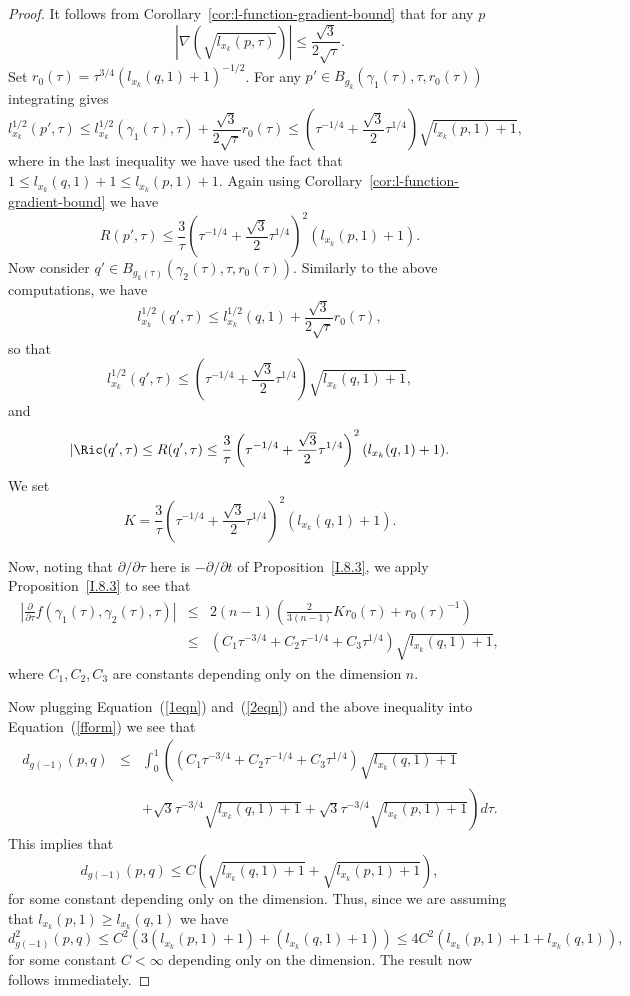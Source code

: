 \begin{proof}
 It follows from
Corollary~\ref{cor:l-function-gradient-bound} that for any $p$
$$|\nabla (\sqrt{l_{x_k}(p,\tau)})|\le
\frac{\sqrt{3}}{2\sqrt{\tau}}.$$ Set
$r_0(\tau)=\tau^{3/4}(l_{x_k}(q,1)+1)^{-1/2}$. For any $p'\in
B_{g_k}(\gamma_1(\tau),\tau,r_0(\tau))$ integrating gives
$$l_{x_k}^{1/2}(p',\tau)\le
l_{x_k}^{1/2}(\gamma_1(\tau),\tau)+\frac{\sqrt{3}}{2\sqrt{\tau}}r_0(\tau)\le
\left(\tau^{-1/4}+\frac{\sqrt{3}}{2}\tau^{1/4}\right)\sqrt{l_{x_k}(p,1)+1},$$
where in the last inequality we have used the fact that $1\le
l_{x_k}(q,1)+1\le l_{x_k}(p,1)+1$. Again using
Corollary~\ref{cor:l-function-gradient-bound} we have
$$R(p',\tau)\le
\frac{3}{\tau}\left(\tau^{-1/4}+\frac{\sqrt{3}}{2}\tau^{1/4}\right)^2(l_{x_k}(p,1)+1).$$
Now consider $q'\in B_{g_k(\tau)}(\gamma_2(\tau),\tau,r_0(\tau))$.
Similarly to the above computations, we have
$$l^{1/2}_{x_k}(q',\tau)\le
l_{x_k}^{1/2}(q,1)+\frac{\sqrt{3}}{2\sqrt{\tau}}r_0(\tau),$$ so that
$$l_{x_k}^{1/2}(q',\tau)\le \left(\tau^{-1/4}
+\frac{\sqrt{3}}{2}\tau^{1/4}\right)\sqrt{l_{x_k}(q,1)+1},$$ and
$$|\Ric(q',\tau)\le R(q',\tau)\le
\frac{3}{\tau}\left(\tau^{-1/4}+\frac{\sqrt{3}}{2}\tau^{1/4}\right)^2(l_{x_k}(q,1)+1).$$
We set
$$K=\frac{3}{\tau}\left(\tau^{-1/4}+\frac{\sqrt{3}}{2}\tau^{1/4}\right)^2(l_{x_k}(q,1)+1).$$

Now, noting that $\partial/\partial \tau$ here is
$-\partial/\partial t$ of Proposition~\ref{I.8.3}, we apply
Proposition~\ref{I.8.3} to see that
\begin{eqnarray*}
\left|\frac{\partial}{\partial
\tau}f(\gamma_1(\tau),\gamma_2(\tau),\tau)\right|
& \le & 2(n-1)\left(\frac{2}{3(n-1)}Kr_0(\tau)+r_0(\tau)^{-1}\right) \\
& \le &
\left(C_1\tau^{-3/4}+C_2\tau^{-1/4}+C_3\tau^{1/4}\right)\sqrt{l_{x_k}(q,1)+1},
\end{eqnarray*}
where $C_1,C_2,C_3$ are constants depending only on the dimension
$n$.

Now plugging Equation~(\ref{1eqn}) and~(\ref{2eqn}) and  the above
inequality into Equation~(\ref{fform}) we see that
\begin{eqnarray*}
d_{g(-1)}(p,q) & \le &
\int_0^1\left(\left(C_1\tau^{-3/4}+C_2\tau^{-1/4}+C_3\tau^{1/4}\right)\sqrt{l_{x_k}(q,1)+1}\right.
\\ & & +
\left.\sqrt{3}\tau^{-3/4}\sqrt{l_{x_k}(q,1)+1}+\sqrt{3}\tau^{-3/4}\sqrt{l_{x_k}(p,1)+1}\right)d\tau.
\end{eqnarray*}
This implies that
$$d_{g(-1)}(p,q)\le
C\left(\sqrt{l_{x_k}(q,1)+1}+\sqrt{l_{x_k}(p,1)+1}\right),$$ for
some constant depending only on the dimension. Thus, since we are
assuming that $l_{x_k}(p,1)\ge l_{x_k}(q,1)$ we have
$$d^2_{g(-1)}(p,q)\le
C^2\left(3(l_{x_k}(p,1)+1)+(l_{x_k}(q,1)+1)\right)\le
4C^2(l_{x_k}(p,1)+1+l_{x_k}(q,1)),$$ for some constant $C<\infty$
depending only on the dimension. The result now follows immediately.
\end{proof}


